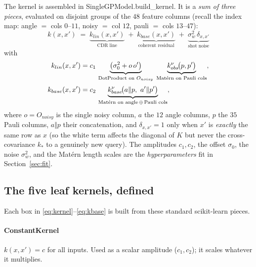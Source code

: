 \documentclass[11pt]{article}
\def\bm#1{#1}%
\def\texttt#1{#1}%
\def\mathrm#1{#1}%
\begin{document}
The kernel is assembled in \texttt{SingleGPModel.build\_kernel}. It is a
\emph{sum of three pieces}, evaluated on disjoint groups of the $48$ feature
columns (recall the index map: angle $=$ cols $0$--$11$, noisy $=$ col $12$,
pauli $=$ cols $13$--$47$):
\begin{equation}
\boxed{\,k(\bm x,\bm x')\;=\;\underbrace{k_{\mathrm{lin}}(\bm x,\bm x')}_{\text{CDR line}}
\;+\;\underbrace{k_{\mathrm{base}}(\bm x,\bm x')}_{\text{coherent residual}}
\;+\;\underbrace{\sigma_w^2\,\delta_{\bm x,\bm x'}}_{\text{shot noise}}\,}
\label{eq:kernel}
\end{equation}
with
\begin{align}
k_{\mathrm{lin}}(\bm x,\bm x')&=c_1\,
\underbrace{\big(\sigma_0^2+o\,o'\big)}_{\text{DotProduct on }O_{\mathrm{noisy}}}\;
\underbrace{k^{\nu}_{\mathrm{obs}}\!\big(\bm p,\bm p'\big)}_{\text{Mat\'ern on Pauli cols}},
\label{eq:klin}\\[2pt]
k_{\mathrm{base}}(\bm x,\bm x')&=c_2\,
\underbrace{k^{\nu}_{\mathrm{base}}\!\big(\bm a\Vert\bm p,\ \bm a'\Vert\bm p'\big)}_{\text{Mat\'ern on angle\,$\oplus$\,Pauli cols}} ,
\label{eq:kbase}
\end{align}
where $o=O_{\mathrm{noisy}}$ is the single noisy column, $\bm a$ the $12$ angle
columns, $\bm p$ the $35$ Pauli columns, $\bm a\Vert\bm p$ their concatenation,
and $\delta_{\bm x,\bm x'}=1$ only when $\bm x'$ is \emph{exactly} the same row as
$\bm x$ (so the white term affects the diagonal of $K$ but never the
cross-covariance $\bm k_*$ to a genuinely new query). The amplitudes
$c_1,c_2$, the offset $\sigma_0$, the noise $\sigma_w^2$, and the Mat\'ern length
scales are the \emph{hyperparameters} fit in Section~\ref{sec:fit}.

\subsection{The five leaf kernels, defined}
Each box in \eqref{eq:kernel}--\eqref{eq:kbase} is built from these standard
scikit-learn pieces.

\paragraph{ConstantKernel} $k(\bm x,\bm x')=c$ for all inputs. Used as a scalar
amplitude ($c_1,c_2$); it scales whatever it multiplies.
\end{document}
